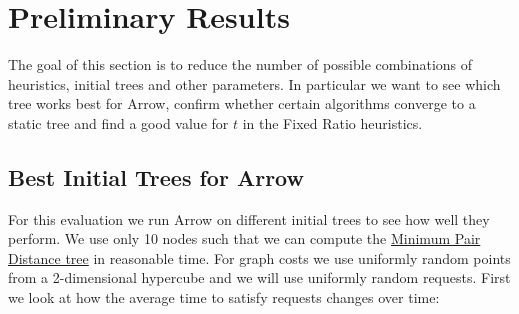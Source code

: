 \documentclass[a4paper, oneside]{discothesis}
\begin{document}
\newcommand{\evalTime}{Average request time $\mathcal{C}_{time}$}
\newcommand{\evalHops}{Average request hops $\mathcal{C}_{hops}$}
\newcommand{\evalEdges}{Average tree edge distance $\mathcal{C}_{edges}$}


\section{Preliminary Results}

The goal of this section is to reduce the number of possible combinations of heuristics, initial trees and other parameters. In particular we want to see which tree works best for Arrow, confirm whether certain algorithms converge to a static tree and find a good value for $t$ in the Fixed Ratio heuristics.

\subsection{Best Initial Trees for Arrow}\label{result:trees}

For this evaluation we run Arrow on different initial trees to see how well they perform. We use only 10 nodes such that we can compute the \hyperref[tree:mpd]{Minimum Pair Distance tree} in reasonable time. For graph costs we use uniformly random points from a 2-dimensional hypercube and we will use uniformly random requests. First we look at how the average time to satisfy requests changes over time:

\end{document}
